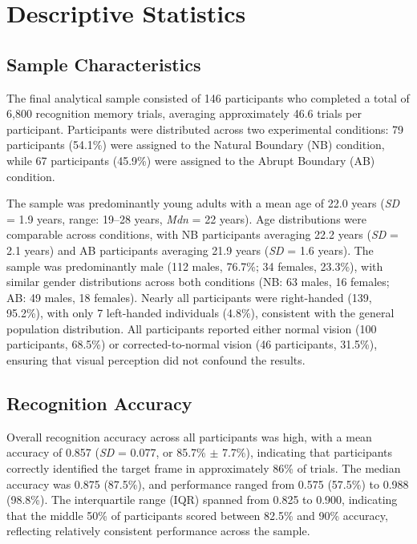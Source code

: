
\section{Descriptive Statistics}

\subsection{Sample Characteristics}

The final analytical sample consisted of 146 participants who completed a total of 6,800 recognition memory trials, averaging approximately 46.6 trials per participant. Participants were distributed across two experimental conditions: 79 participants (54.1\%) were assigned to the Natural Boundary (NB) condition, while 67 participants (45.9\%) were assigned to the Abrupt Boundary (AB) condition. 

The sample was predominantly young adults with a mean age of 22.0 years (\textit{SD} = 1.9 years, range: 19--28 years, \textit{Mdn} = 22 years). Age distributions were comparable across conditions, with NB participants averaging 22.2 years (\textit{SD} = 2.1 years) and AB participants averaging 21.9 years (\textit{SD} = 1.6 years). The sample was predominantly male (112 males, 76.7\%; 34 females, 23.3\%), with similar gender distributions across both conditions (NB: 63 males, 16 females; AB: 49 males, 18 females). Nearly all participants were right-handed (139, 95.2\%), with only 7 left-handed individuals (4.8\%), consistent with the general population distribution. All participants reported either normal vision (100 participants, 68.5\%) or corrected-to-normal vision (46 participants, 31.5\%), ensuring that visual perception did not confound the results.

\subsection{Recognition Accuracy}

Overall recognition accuracy across all participants was high, with a mean accuracy of 0.857 (\textit{SD} = 0.077, or 85.7\% $\pm$ 7.7\%), indicating that participants correctly identified the target frame in approximately 86\% of trials. The median accuracy was 0.875 (87.5\%), and performance ranged from 0.575 (57.5\%) to 0.988 (98.8\%). The interquartile range (IQR) spanned from 0.825 to 0.900, indicating that the middle 50\% of participants scored between 82.5\% and 90\% accuracy, reflecting relatively consistent performance across the sample.

